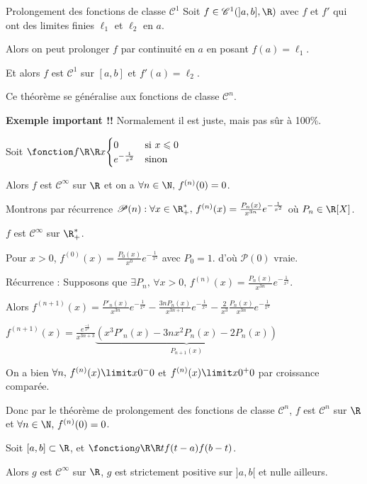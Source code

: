 \begin{theoreme}{Prolongement des fonctions de classe $\mathscr C^1$}{}
    Soit $f \in \mathscr C^1(]a, b], \R)$ avec $f$ et $f'$ qui ont des limites finies 
    $\ell_1$ et $\ell_2$ en $a$. 

    Alors on peut prolonger $f$ par continuité en $a$ en posant $f(a) = \ell_1$.

    Et alors $f$ est $\mathscr C^1$ sur $[a, b]$ et $f'(a) = \ell_2$.
\end{theoreme}

\begin{remarque}
    Ce théorème se généralise aux fonctions de classe $\mathscr C^n$.
\end{remarque}

\begin{exemple}
    \textbf{Exemple important !!}
    Normalement il est juste, mais pas sûr à 100\%.

    Soit $\fonction f \R \R x {\begin{cases}
        0 & \text{si } x \leqslant 0\\
        e^{-\frac{1}{x^2}} & \text{sinon}
    \end{cases}}$

    Alors $f$ est $\mathscr C^\infty$ sur $\R$ et on a $\forall n \in \N, \, f^{(n)}(0) = 0$.

    Montrons par récurrence $\mathscr P(n) : \forall x \in \R_+^*, \, f^{(n)}(x) = \frac{P_n(x) }{x^{3n}} e^{-\frac{1}{x^2}}$ où $P_n \in \R [X]$. 

    $f$ est $\mathscr C^\infty$ sur $\R_+^*$. 

    Pour $x > 0$, $f^{(0)}(x) = \frac{P_0(x )}{x^0} e^{-\frac{1}{x^2}}$ avec $P_0 = 1$.
    d'où $\mathscr P(0)$ vraie.

    \avspace Récurrence : Supposons que $\displaystyle \exists P_n, \, \forall x > 0, \, f^{(n)}(x) = \frac{P_n(x)}{x^{3n}} e^{-\frac{1}{x^2}}$.

    Alors $\displaystyle f^{(n+1)}(x) = \frac{P'_n(x)}{x^{3n}} e^{-\frac{1}{x^2}}  - \frac{3n P_n(x)}{x^{3n + 1}}e^{-\frac{1}{x^2}} - \frac 2 {x^3} \frac{P_n(x)}{x^{3n}}e^{-\frac{1}{x^2}}$

    $f^{(n+1)}(x) = \frac{e^{\frac{-1}{x^2}}}{x^{3n + 3}} \underbrace{\left( x^3 P'_n(x) - 3nx^2 P_n(x) - 2P_n(x) \right)}_{P_{n+1}(x)}$

    On a bien $\forall n, \, f^{(n)}(x) \limit x {0^-} 0 $ et $f^{(n)}(x) \limit x {0^+} 0$ par croissance comparée. 

    Donc par le théorème de prolongement des fonctions de classe $\mathscr C^n$, $f$ est $\mathscr C^n$ sur $\R$ et $\forall n \in \N, \, f^{(n)}(0) = 0$.


    Soit $[a, b] \subset \R$, et $\fonction g \R \R t {f(t-a)f(b-t)}$.

    Alors $g$ est $\mathscr C^\infty$ sur $\R$, $g$ est strictement positive sur $]a, b[$ et nulle ailleurs.

\end{exemple}


